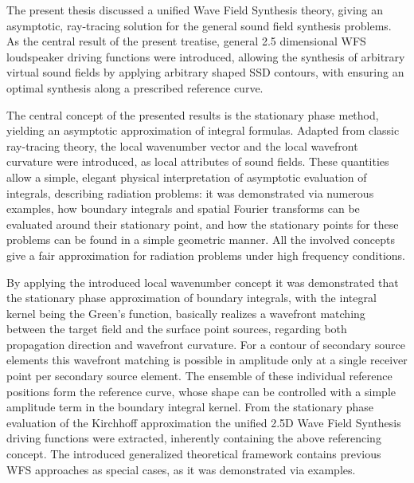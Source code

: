 The present thesis discussed a unified Wave Field Synthesis theory, giving an asymptotic, ray-tracing solution for the general sound field synthesis problems.
As the central result of the present treatise, general 2.5 dimensional WFS loudspeaker driving functions were introduced, allowing the synthesis of arbitrary virtual sound fields by applying arbitrary shaped SSD contours, with ensuring an optimal synthesis along a prescribed reference curve.

The central concept of the presented results is the stationary phase method, yielding an asymptotic approximation of integral formulas.
Adapted from classic ray-tracing theory, the local wavenumber vector and the local wavefront curvature were introduced, as local attributes of sound fields.
These quantities allow a simple, elegant physical interpretation of asymptotic evaluation of integrals, describing radiation problems: it was demonstrated via numerous examples, how boundary integrals and spatial Fourier transforms can be evaluated around their stationary point, and how the stationary points for these problems can be found in a simple geometric manner.
All the involved concepts give a fair approximation for radiation problems under high frequency conditions.

By applying the introduced local wavenumber concept it was demonstrated that the stationary phase approximation of boundary integrals, with the integral kernel being the Green's function, basically realizes a wavefront matching between the target field and the surface point sources, regarding both propagation direction and wavefront curvature.
For a contour of secondary source elements this wavefront matching is possible in amplitude only at a single receiver point per secondary source element.
The ensemble of these individual reference positions form the reference curve, whose shape can be controlled with a simple amplitude term in the boundary integral kernel.
From the stationary phase evaluation of the Kirchhoff approximation the unified 2.5D Wave Field Synthesis driving functions were extracted, inherently containing the above referencing concept.
The introduced generalized theoretical framework contains previous WFS approaches as special cases, as it was demonstrated via examples.

